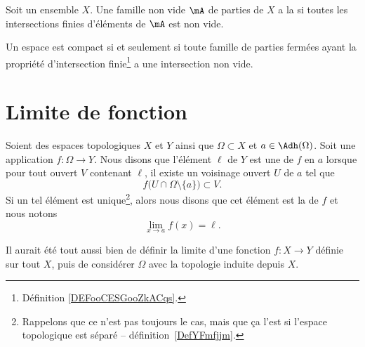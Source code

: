\begin{definition}      \label{DEFooCESGooZkACqs}
	Soit un ensemble \( X\). Une famille non vide \( \mA\) de parties de \( X\) a la  si toutes les intersections finies d'éléments de \( \mA\) est non vide.
\end{definition}

\begin{theorem}       \label{THOooCQSQooDuasqo}
	Un espace est compact si et seulement si toute famille de parties fermées ayant la propriété d'intersection finie\footnote{Définition \ref{DEFooCESGooZkACqs}.} a une intersection non vide.
\end{theorem}

\section{Limite de fonction}

\begin{definition}\label{DefYNVoWBx}
	Soient des espaces topologiques \( X\) et \( Y\) ainsi que \( \Omega\subset X\) et \( a\in \Adh(\Omega)\). Soit une application \( f\colon \Omega\to Y\). Nous disons que l'élément \( \ell\) de \( Y\) est une  de \( f\) en \( a\) lorsque pour tout ouvert \( V\) contenant \( \ell\), il existe un voisinage ouvert \( U\) de \( a\) tel que
	\begin{equation}        \label{EQooXLJJooZDcOtU}
		f\big( U\cap\Omega\setminus\{ a \} \big)\subset V.
	\end{equation}
	Si un tel élément est unique\footnote{Rappelons que ce n'est pas toujours le cas, mais que ça l'est si l'espace topologique est séparé -- définition~\ref{DefYFmfjjm}.}, alors nous disons que cet élément est la  de \( f\) et nous notons
	\begin{equation}
		\lim_{x\to a} f(x)=\ell.
	\end{equation}
\end{definition}

\begin{normaltext}
	Il aurait été tout aussi bien de définir la limite d'une fonction \( f\colon X\to Y\) définie sur tout \( X\), puis de considérer \( \Omega\) avec la topologie induite depuis \( X\).
\end{normaltext}

